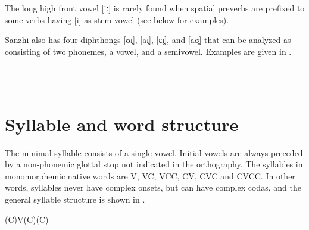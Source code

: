 The long high front vowel [iː] is rarely found when spatial preverbs are prefixed to some verbs having [i] as stem vowel (see  below for examples).

Sanzhi also has four diphthongs [ʊɪ̯], [aɪ̯], [εɪ̯], and [aʊ̯] that can be analyzed as consisting of two phonemes, a vowel, and a semivowel. Examples are given in .
%
\begin{exe}
	\ex	\label{ex:diphthongs phon}
	\TabPositions{11em}
		 	\tab {} 	\\
		 		\tab {} \\
		 	
\end{exe}





\section{Syllable and word structure}
\label{sec:Syllable and word structure}

The minimal syllable consists of a single vowel. Initial vowels are always preceded by a non-phonemic glottal stop not indicated in the orthography. The syllables in monomorphemic native words are V, VC, VCC, CV, CVC and CVCC. In other words, syllables never have complex onsets, but can have complex codas, and the general syllable structure is shown in .
%
\begin{exe}
	\ex	(C)V(C)(C) \label{ex:syllable structure A phon}
\end{exe}

